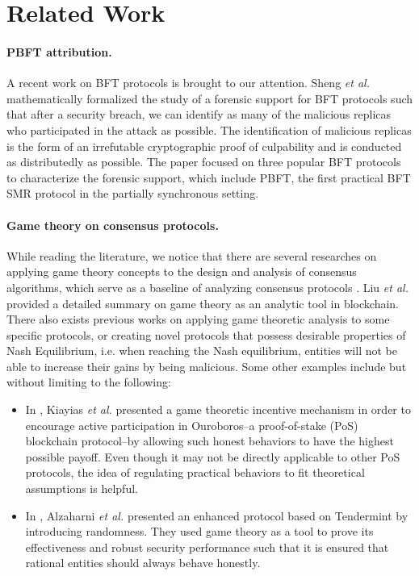 \documentclass[a4paper,11pt]{article}
\begin{document}
\section{Related Work}\label{sec:related-work}
\paragraph{PBFT attribution.} A recent work on BFT protocols is brought to our attention. Sheng \emph{et al.} \cite{sheng2021bft} mathematically formalized the study of a forensic support for BFT protocols such that after a security breach, we can identify as many of the malicious replicas who participated in the attack as possible. The identification of malicious replicas is the form of an irrefutable cryptographic proof of culpability and is conducted as distributedly as possible. The paper \cite{sheng2021bft} focused on three popular BFT protocols to characterize the forensic support, which include PBFT, the first practical BFT SMR protocol in the partially synchronous setting. %

\paragraph{Game theory on consensus protocols.} While reading the literature, we notice that there are several researches on applying game theory concepts to the design and analysis of consensus algorithms, which serve as a baseline of analyzing consensus protocols \cite{10.5555/1296179}. Liu \emph{et al.} \cite{Survey} provided a detailed summary on game theory as an analytic tool in blockchain. There also exists previous works on applying game theoretic analysis to some specific protocols, or creating novel protocols that possess desirable properties of Nash Equilibrium, i.e. when reaching the Nash equilibrium, entities will not be able to increase their gains by being malicious. Some other examples include but without limiting to the following:
\begin{itemize}
    \item In \cite{Kiayias-CRYPTO2017}, Kiayias \emph{et al.} presented a game theoretic incentive mechanism in order to encourage active participation in Ouroboros--a proof-of-stake (PoS) blockchain protocol--by allowing such honest behaviors to have the highest possible payoff. Even though it may not be directly applicable to other PoS protocols, the idea of regulating practical behaviors to fit theoretical assumptions is helpful.
    \item In \cite{Alzahrani-DGTS2018}, Alzaharni \emph{et al.} presented an enhanced protocol based on Tendermint by introducing randomness. They used game theory as a tool to prove its effectiveness and robust security performance such that it is ensured that rational entities should always behave honestly.
\end{itemize}
\end{document}
